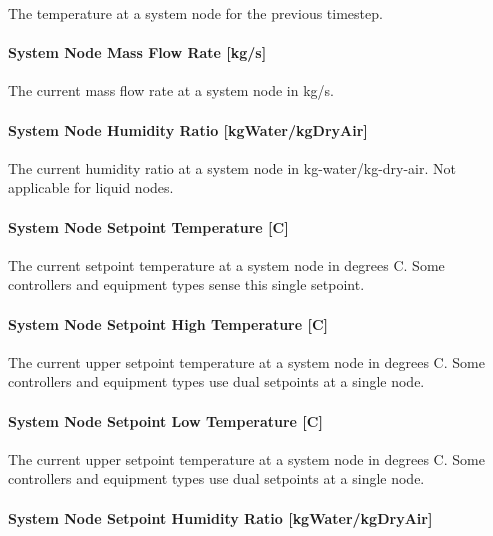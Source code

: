 The temperature at a system node for the previous timestep.

\paragraph{System Node Mass Flow Rate {[}kg/s{]}}\label{system-node-mass-flow-rate-kgs}

The current mass flow rate at a system node in kg/s.

\paragraph{System Node Humidity Ratio {[}kgWater/kgDryAir{]}}\label{system-node-humidity-ratio-kgwaterkgdryair}

The current humidity ratio at a system node in kg-water/kg-dry-air. Not applicable for liquid nodes.

\paragraph{System Node Setpoint Temperature {[}C{]}}\label{system-node-setpoint-temperature-c}

The current setpoint temperature at a system node in degrees C. Some controllers and equipment types sense this single setpoint.

\paragraph{System Node Setpoint High Temperature {[}C{]}}\label{system-node-setpoint-high-temperature-c}

The current upper setpoint temperature at a system node in degrees C. Some controllers and equipment types use dual setpoints at a single node.

\paragraph{System Node Setpoint Low Temperature {[}C{]}}\label{system-node-setpoint-low-temperature-c}

The current upper setpoint temperature at a system node in degrees C. Some controllers and equipment types use dual setpoints at a single node.

\paragraph{System Node Setpoint Humidity Ratio {[}kgWater/kgDryAir{]}}\label{system-node-setpoint-humidity-ratio-kgwaterkgdryair}


